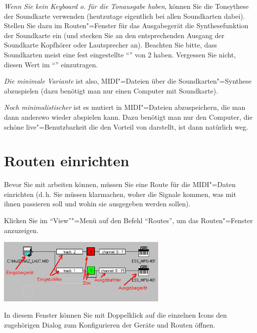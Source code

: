 \emph{Wenn Sie kein Keyboard o. für die Tonausgabe haben}, können Sie
die Tonsythese der Soundkarte verwenden (heutzutage eigentlich bei
allen Soundkarten dabei). Stellen Sie dazu im Routen"=Fenster für das
Ausgabegerät die Synthesefunktion der Soundkarte ein (und stecken Sie
an den entsprechenden Ausgang der Soundkarte Kopfhörer oder
Lautsprecher an). Beachten Sie bitte, dass Soundkarten meist eine fest
eingestellte "`"' von 2
haben. Vergessen Sie nicht, diesen Wert im
"`"' einzutragen.

\emph{Die minimale Variante} ist also, MIDI"=Dateien über die 
Soundkarten"=Synthese abzuspielen (dazu benötigt man nur einen 
Computer mit Soundkarte).


\emph{Noch minimalistischer} ist es
 mutiert in MIDI"=Dateien
abzuspeichern, die man dann anderswo wieder abspielen kann. Dazu
benötigt man nur den Computer, die schöne live"=Benutzbarkeit die den
Vorteil von \mutabor{} darstellt, ist dann natürlich weg.


\section{Routen einrichten}\label{sec:CC_ROUTES}

Bevor Sie mit \mutabor{} arbeiten können, müssen Sie eine Route für
die MIDI"=Daten einrichten (d.\,h. Sie müssen \mutabor{} klarmachen,
woher die Signale kommen, was mit ihnen passieren soll und wohin sie
ausgegeben werden sollen).


Klicken Sie im "`View"'"=Menü auf den Befehl "`Routes"', 
um das Routen"=Fenster anzuzeigen.


\begin{center}
\ifhtml
{}
\else
\includegraphics[width=234pt]{Route}
\fi
\end{center}

In diesem Fenster können Sie mit Doppelklick auf die einzelnen Icons
den zugehörigen Dialog zum Konfigurieren der Geräte und Routen öffnen.

